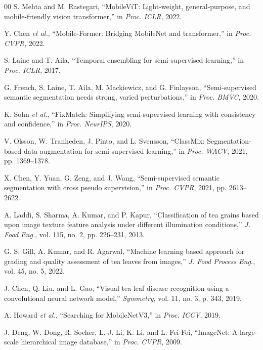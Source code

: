 \documentclass[conference]{IEEEtran}
\begin{document}
\begin{thebibliography}{00}
S. Mehta and M. Rastegari, ``MobileViT: Light-weight, general-purpose, and mobile-friendly vision transformer,'' in \textit{Proc. ICLR}, 2022.

Y. Chen \textit{et al.}, ``Mobile-Former: Bridging MobileNet and transformer,'' in \textit{Proc. CVPR}, 2022.

S. Laine and T. Aila, ``Temporal ensembling for semi-supervised learning,'' in \textit{Proc. ICLR}, 2017.

G. French, S. Laine, T. Aila, M. Mackiewicz, and G. Finlayson, ``Semi-supervised semantic segmentation needs strong, varied perturbations,'' in \textit{Proc. BMVC}, 2020.

K. Sohn \textit{et al.}, ``FixMatch: Simplifying semi-supervised learning with consistency and confidence,'' in \textit{Proc. NeurIPS}, 2020.

V. Olsson, W. Tranheden, J. Pinto, and L. Svensson, ``ClassMix: Segmentation-based data augmentation for semi-supervised learning,'' in \textit{Proc. WACV}, 2021, pp. 1369--1378.

X. Chen, Y. Yuan, G. Zeng, and J. Wang, ``Semi-supervised semantic segmentation with cross pseudo supervision,'' in \textit{Proc. CVPR}, 2021, pp. 2613--2622.

A. Laddi, S. Sharma, A. Kumar, and P. Kapur, ``Classification of tea grains based upon image texture feature analysis under different illumination conditions,'' \textit{J. Food Eng.}, vol. 115, no. 2, pp. 226--231, 2013.

G. S. Gill, A. Kumar, and R. Agarwal, ``Machine learning based approach for grading and quality assessment of tea leaves from images,'' \textit{J. Food Process Eng.}, vol. 45, no. 5, 2022.

J. Chen, Q. Liu, and L. Gao, ``Visual tea leaf disease recognition using a convolutional neural network model,'' \textit{Symmetry}, vol. 11, no. 3, p. 343, 2019.

A. Howard \textit{et al.}, ``Searching for MobileNetV3,'' in \textit{Proc. ICCV}, 2019.

J. Deng, W. Dong, R. Socher, L.-J. Li, K. Li, and L. Fei-Fei, ``ImageNet: A large-scale hierarchical image database,'' in \textit{Proc. CVPR}, 2009.

\end{thebibliography}

\end{document}
